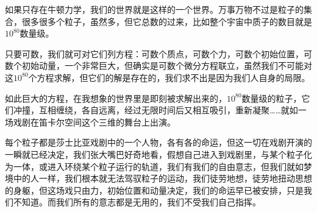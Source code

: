 如果只存在牛顿力学，我们的世界就是这样的一个世界。万事万物不过是粒子的集合，很多很多个粒子，虽然多，但它总数的过来，比如整个宇宙中质子的数目就是$10^{80}$数量级。

只要可数，我们就可对它们列方程：可数个质点，可数个力，可数个初始位置，可数个初始动量，一个非常巨大，但确实是可数个微分方程联立，虽然我们不可能对这$10^{80}$个方程求解，但它们的解是存在的，我们求不出是因为我们人自身的局限。

如此巨大的方程，在我想象的世界里是即刻被求解出来的，$10^{80}$数量级的粒子，它们冲撞，互相缠绕，各自远离，经过无限时间后又相互吸引，重新凝聚……就如一场戏剧在笛卡尔空间这个三维的舞台上出演。

每个粒子都是莎士比亚戏剧中的一个人物，各有各的命运，但这一切在戏剧开演的一瞬就已经决定，我们张大嘴巴好奇地看，假想自己进入到戏剧里，与某个粒子化为一体，或进入环绕某个粒子运行的轨道，我们有我们的自由意志，但我们就如梦境中的人一样，我们根本就无法驾驭粒子的运动，我们徒劳地想，徒劳地扭动思想的身躯，但这场戏只由力，初始位置和动量决定，我们的命运早已被安排，只是我们不知道。而我们所有的意志都是无用的，我们不受我们自己指挥。

